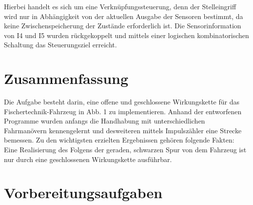 \documentclass[a4paper, 12pt]{article}
\begin{document}
Hierbei handelt es sich um eine Verknüpfungssteuerung, denn der Stelleingriff wird nur in Abhängigkeit von der aktuellen Ausgabe der Sensoren bestimmt, da keine Zwischenspeicherung der Zustände erforderlich ist.  
Die Sensorinformation von I4 und I5  wurden rückgekoppelt und mittels einer logischen kombinatorischen Schaltung das Steuerungsziel erreicht.   

\section*{Zusammenfassung}

Die Aufgabe besteht darin, eine offene und geschlossene Wirkungskette für das Fischertechnik-Fahrzeug in Abb. 1 zu implementieren.
Anhand der entworfenen Programme wurden anfangs die Handhabung mit unterschiedlichen Fahrmanövern kennengelernt und desweiteren mittels Impulszähler eine Strecke bemessen.
Zu den wichtigsten erzielten Ergebnissen gehören folgende Fakten: Eine Realisierung des Folgens der
geraden, schwarzen Spur von dem Fahrzeug ist nur durch eine geschlossenen Wirkungskette ausführbar.


\section*{Vorbereitungsaufgaben}
\end{document}
